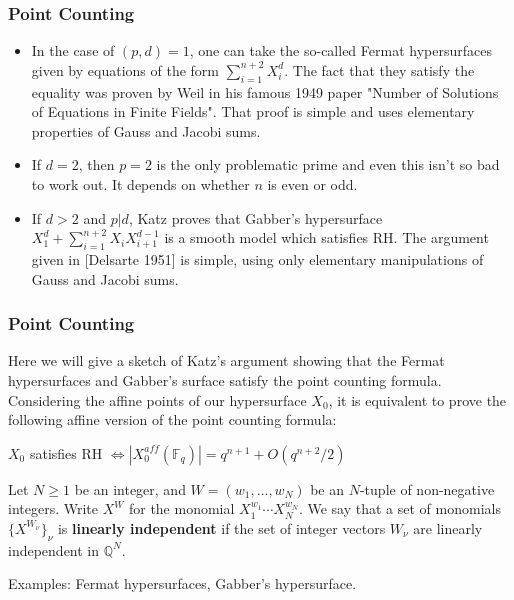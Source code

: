 \documentclass{beamer}
\begin{document}
\begin{frame}
\frametitle{Point Counting}
\begin{itemize}
\item In the case of $(p,d)=1$, one can take the so-called Fermat hypersurfaces given by equations of the form $\sum\limits_{i=1}^{n+2}X_{i}^{d}$. The fact that they satisfy the equality was proven by Weil in his famous 1949 paper "Number of Solutions of Equations in Finite Fields". That proof is simple and uses elementary properties of Gauss and Jacobi sums.  
\pause
\item If $d=2$, then $p=2$ is the only problematic prime and even this isn't so bad to work out. It depends on whether $n$ is even or odd.
\pause
\item If $d>2$ and $p|d$, Katz proves that Gabber's hypersurface $X_{1}^{d} + \sum\limits_{i = 1}^{n+2}X_{i}X_{i+1}^{d-1}$ is a smooth model which satisfies RH. The argument given in [Delsarte 1951] is simple, using only elementary manipulations of Gauss and Jacobi sums. 
\end{itemize}
\end{frame}

\begin{frame}
\frametitle{Point Counting}
Here we will give a sketch of Katz's argument showing that the Fermat hypersurfaces and Gabber's surface satisfy the point counting formula.
\pause
Considering the affine points of our hypersurface $X_{0}$, it is equivalent to prove the following affine version of the point counting formula:
\begin{center}
$X_{0}$ satisfies RH $\Leftrightarrow |X_{0}^{aff}(\mathbb{F}_{q})| = q^{n+1} + O(q^{n+2}/2)$
\end{center}
\pause

\begin{definition}
Let $N\geq 1$ be an integer, and $W=(w_1,\ldots,w_N)$ be an $N$-tuple of non-negative integers. Write $X^{W}$ for the monomial $X_{1}^{w_{1}}\cdots X_{N}^{w_{N}}$. We say that a set of monomials $\{X^{W_{\nu}}\}_{\nu}$ is \textbf{linearly independent} if the set of integer vectors $W_{\nu}$ are linearly independent in $\mathbb{Q}^N$. 
\end{definition}
\pause
Examples: Fermat hypersurfaces, Gabber's hypersurface.
\end{frame}
\end{document}

